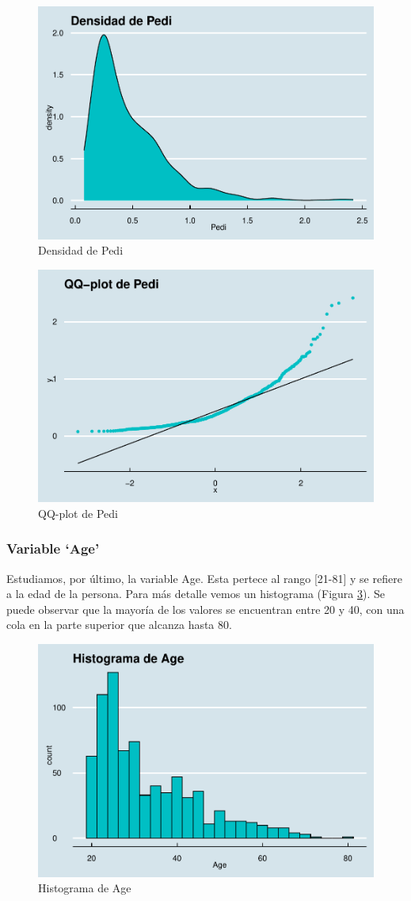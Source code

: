 \documentclass[
]{article}
\begin{document}
\begin{figure}

{\centering \includegraphics[width=0.5\linewidth]{pima-clasificacion_files/figure-latex/dens_pedi-1} 

}

\caption{Densidad de Pedi}\label{fig:dens_pedi}
\end{figure}

\begin{figure}

{\centering \includegraphics[width=0.5\linewidth]{pima-clasificacion_files/figure-latex/qq_pedi-1} 

}

\caption{QQ-plot de Pedi}\label{fig:qq_pedi}
\end{figure}

\hypertarget{variable-age}{%
\subsubsection{Variable `Age'}\label{variable-age}}

Estudiamos, por último, la variable Age. Esta pertece al rango
{[}21-81{]} y se refiere a la edad de la persona. Para más detalle vemos
un histograma (Figura \ref{fig:hist_age}). Se puede observar que la
mayoría de los valores se encuentran entre 20 y 40, con una cola en la
parte superior que alcanza hasta 80.

\begin{figure}

{\centering \includegraphics[width=0.5\linewidth]{pima-clasificacion_files/figure-latex/hist_age-1} 

}

\caption{Histograma de Age}\label{fig:hist_age}
\end{figure}
\end{document}
